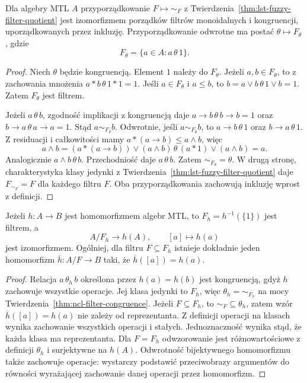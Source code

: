 \begin{twierdzenie}
\label{thm:ncl-filter-congruence}
Dla algebry MTL $A$ przyporządkowanie $F\mapsto\sim_F$
z Twierdzenia~\ref{thm:lst-fuzzy-filter-quotient} jest
izomorfizmem porządków filtrów monoidalnych i kongruencji,
uporządkowanych przez inkluzję. Przyporządkowanie odwrotne
ma postać $\theta\mapsto F_\theta$, gdzie
\[
 F_\theta=\{a\in A:a\,\theta\,1\}.
\]
\end{twierdzenie}
\begin{proof}
Niech $\theta$ będzie kongruencją. Element $1$ należy
do $F_\theta$. Jeżeli $a,b\in F_\theta$, to z zachowania
mnożenia $a*b\,\theta\,1*1=1$. Jeśli $a\in F_\theta$
i $a\leq b$, to
$b=a\vee b\,\theta\,1\vee b=1$. Zatem $F_\theta$ jest filtrem.

Jeżeli $a\,\theta\, b$, zgodność implikacji z kongruencją
daje $a\to b\,\theta\,b\to b=1$ oraz
$b\to a\,\theta\,a\to a=1$. Stąd $a\sim_{F_\theta}b$.
Odwrotnie, jeśli $a\sim_{F_\theta}b$, to
$a\to b\,\theta\,1$ oraz $b\to a\,\theta\,1$.
Z residuacji i całkowitości mamy
$a*(a\to b)\leq a\wedge b$, więc
\[
 a\wedge b=(a*(a\to b))\vee(a\wedge b)
 \,\theta\, (a*1)\vee(a\wedge b)=a.
\]
Analogicznie $a\wedge b\,\theta\,b$.
Przechodniość daje $a\,\theta\,b$. Zatem
$\sim_{F_\theta}=\theta$.
W drugą stronę, charakterystyka klasy jedynki
z Twierdzenia~\ref{thm:lst-fuzzy-filter-quotient}
daje $F_{\sim_F}=F$ dla każdego filtru $F$.
Oba przyporządkowania zachowują inkluzję wprost z definicji.
\end{proof}

\begin{wniosek}
\label{cor:ncl-filter-universal}
Jeżeli $h:A\to B$ jest homomorfizmem algebr MTL,
to $F_h=h^{-1}(\{1\})$ jest filtrem, a
\[
 A/F_h \longrightarrow h(A),\qquad [a]\longmapsto h(a)
\]
jest izomorfizmem. Ogólniej, dla filtru $F\subseteq F_h$
istnieje dokładnie jeden homomorfizm
$\overline h:A/F\to B$ taki, że $\overline h([a])=h(a)$.
\end{wniosek}
\begin{proof}
Relacja $a\,\theta_h\,b$ określona przez $h(a)=h(b)$
jest kongruencją, gdyż $h$ zachowuje wszystkie operacje.
Jej klasa jedynki to $F_h$, więc
$\theta_h=\sim_{F_h}$ na mocy
Twierdzenia~\ref{thm:ncl-filter-congruence}.
Jeżeli $F\subseteq F_h$, to $\sim_F\subseteq\theta_h$,
zatem wzór $\overline h([a])=h(a)$ nie zależy od reprezentanta.
Z definicji operacji na klasach wynika zachowanie wszystkich
operacji i stałych. Jednoznaczność wynika stąd, że każda
klasa ma reprezentanta. Dla $F=F_h$ odwzorowanie jest
różnowartościowe z definicji $\theta_h$ i surjektywne na $h(A)$.
Odwrotność bijektywnego homomorfizmu także zachowuje operacje:
wystarczy podstawić przeciwobrazy argumentów do równości
wyrażającej zachowanie danej operacji przez homomorfizm.
\end{proof}

